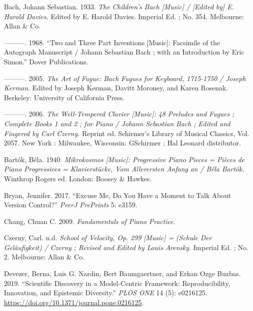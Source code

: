 \documentclass[
]{article}
\newlength{\cslhangindent}
\newenvironment{cslreferences}%
  {\setlength{\parindent}{0pt}%
  \everypar{\setlength{\hangindent}{\cslhangindent}}\ignorespaces}%
  {\par}
\begin{document}
\hypertarget{refs}{}
\begin{cslreferences}
\leavevmode\hypertarget{ref-bach_childrenbachmusic_1933}{}%
Bach, Johann Sebastian. 1933. \emph{The Children's Bach {[}Music{]} /
{[}Edited by{]} E. Harold Davies.} Edited by E. Harold Davies. Imperial
Ed. ; No. 354. Melbourne: Allan \& Co.

\leavevmode\hypertarget{ref-bach_twothreepart_1968}{}%
---------. 1968. ``Two and Three Part Inventions {[}Music{]}: Facsimile
of the Autograph Manuscript / Johann Sebastian Bach ; with an
Introduction by Eric Simon.'' Dover Publications.

\leavevmode\hypertarget{ref-bach_artfuguebach_2005}{}%
---------. 2005. \emph{The Art of Fugue: Bach Fugues for Keyboard,
1715-1750 / Joseph Kerman.} Edited by Joseph Kerman, Davitt Moroney, and
Karen Rosenak. Berkeley: University of California Press.

\leavevmode\hypertarget{ref-bach_welltemperedclaviermusic_2006}{}%
---------. 2006. \emph{The Well-Tempered Clavier {[}Music{]}: 48
Preludes and Fugues ; Complete Books 1 and 2 ; for Piano / Johann
Sebastian Bach ; Edited and Fingered by Carl Czerny.} Reprint ed.
Schirmer's Library of Musical Classics, Vol. 2057. New York : Milwaukee,
Wisconsin: GSchirmer ; Hal Leonard distributor.

\leavevmode\hypertarget{ref-bartok_mikrokosmosmusicprogressive_1940}{}%
Bartók, Béla. 1940. \emph{Mikrokosmos {[}Music{]}: Progressive Piano
Pieces = Pièces de Piano Progressives = Klavierstücke, Vom Allerersten
Anfang an / Béla Bartók.} Winthrop Rogers ed. London: Boosey \& Hawkes.

\leavevmode\hypertarget{ref-Bryan2017ExcuseMD}{}%
Bryan, Jennifer. 2017. ``Excuse Me, Do You Have a Moment to Talk About
Version Control?'' \emph{PeerJ PrePrints} 5: e3159.

\leavevmode\hypertarget{ref-chang_fundamentalspianopractice_2009a}{}%
Chang, Chuan C. 2009. \emph{Fundamentals of Piano Practice}.

\leavevmode\hypertarget{ref-czerny_schoolvelocityop_19}{}%
Czerny, Carl. n.d. \emph{School of Velocity, Op. 299 {[}Music{]} =
(Schule Der Geläufigkeit) / Czerny ; Revised and Edited by Louis
Arensky.} Imperial Ed. ; No. 2. Melbourne: Allan \& Co.

\leavevmode\hypertarget{ref-devezerScientificDiscoveryModelcentric2019}{}%
Devezer, Berna, Luis G. Nardin, Bert Baumgaertner, and Erkan Ozge
Buzbas. 2019. ``Scientific Discovery in a Model-Centric Framework:
Reproducibility, Innovation, and Epistemic Diversity.'' \emph{PLOS ONE}
14 (5): e0216125. \url{https://doi.org/10.1371/journal.pone.0216125}.


\end{cslreferences}
\end{document}
